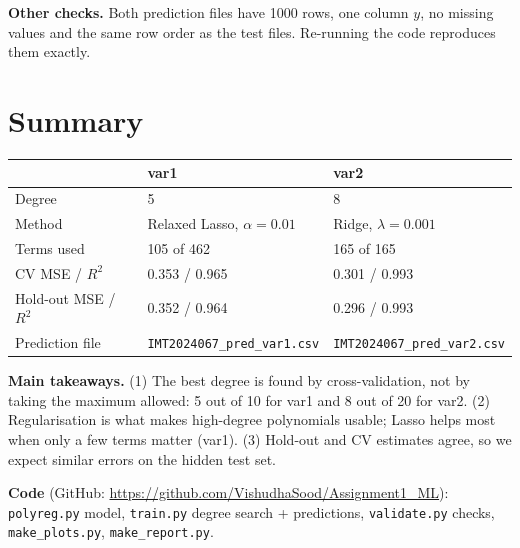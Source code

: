 \documentclass[11pt,a4paper]{article}
\begin{document}
\textbf{Other checks.} Both prediction files have 1000 rows, one column $y$, no missing values and
the same row order as the test files. Re-running the code reproduces them exactly.

\section{Summary}
\begin{table}[H]
\centering
\begin{tabular}{lll}
\toprule
 & var1 & var2 \\
\midrule
Degree & 5 & 8 \\
Method & Relaxed Lasso, $\alpha = 0.01$ & Ridge, $\lambda = 0.001$ \\
Terms used & 105 of 462 & 165 of 165 \\
CV MSE / $R^2$ & 0.353 / 0.965 & 0.301 / 0.993 \\
Hold-out MSE / $R^2$ & 0.352 / 0.964 & 0.296 / 0.993 \\
Prediction file & \texttt{IMT2024067\_pred\_var1.csv} & \texttt{IMT2024067\_pred\_var2.csv} \\
\bottomrule
\end{tabular}
\end{table}

\textbf{Main takeaways.} (1) The best degree is found by cross-validation, not by taking the maximum
allowed: 5 out of 10 for var1 and 8 out of 20 for var2. (2) Regularisation is what makes
high-degree polynomials usable; Lasso helps most when only a few terms matter (var1).
(3) Hold-out and CV estimates agree, so we expect similar errors on the hidden test set.

\textbf{Code} (GitHub: \url{https://github.com/VishudhaSood/Assignment1_ML}): \texttt{polyreg.py} model, \texttt{train.py} degree search + predictions,
\texttt{validate.py} checks, \texttt{make\_plots.py}, \texttt{make\_report.py}.
\end{document}

